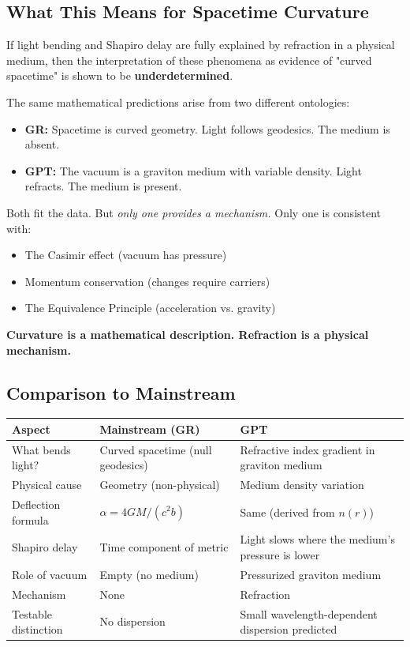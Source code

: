 \documentclass[12pt, a4paper]{article}
\begin{document}
\subsection{What This Means for Spacetime Curvature}
\label{subsec:curvature_underdetermined}

If light bending and Shapiro delay are fully explained by refraction in a physical medium, then the interpretation of these phenomena as evidence of "curved spacetime" is shown to be \textbf{underdetermined}.

The same mathematical predictions arise from two different ontologies:

\begin{itemize}
    \item \textbf{GR:} Spacetime is curved geometry. Light follows geodesics. The medium is absent.
    \item \textbf{GPT:} The vacuum is a graviton medium with variable density. Light refracts. The medium is present.
\end{itemize}

Both fit the data. But \textit{only one provides a mechanism.} Only one is consistent with:
\begin{itemize}
    \item The Casimir effect (vacuum has pressure)
    \item Momentum conservation (changes require carriers)
    \item The Equivalence Principle (acceleration vs. gravity)
\end{itemize}

\textbf{Curvature is a mathematical description. Refraction is a physical mechanism.}

\subsection{Comparison to Mainstream}
\label{subsec:light_comparison_mainstream}

\begin{center}
\begin{tabular}{|p{3.5cm}|p{5cm}|p{5cm}|}
\hline
\textbf{Aspect} & \textbf{Mainstream (GR)} & \textbf{GPT} \\
\hline
What bends light? & Curved spacetime (null geodesics) & Refractive index gradient in graviton medium \\
\hline
Physical cause & Geometry (non-physical) & Medium density variation \\
\hline
Deflection formula & \( \alpha = 4GM/(c^2 b) \) & Same (derived from \( n(r) \)) \\
\hline
Shapiro delay & Time component of metric & Light slows where the medium's pressure is lower \\
\hline
Role of vacuum & Empty (no medium) & Pressurized graviton medium \\
\hline
Mechanism & None & Refraction \\
\hline
Testable distinction & No dispersion & Small wavelength-dependent dispersion predicted \\
\hline
\end{tabular}
\end{center}
\end{document}
